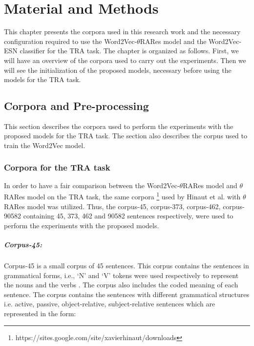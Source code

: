 \chapter{Material and Methods}\label{experiments}

This chapter presents the corpora used in this research work and the necessary configuration required to use the Word2Vec-$\theta$RARes model and the Word2Vec-ESN classifier for the TRA task. The chapter is organized as follows. First, we will have an overview of the corpora used to carry out the experiments. Then we will see the initialization of the proposed models, necessary before using the models for the TRA task.

\section{Corpora and Pre-processing}\label{corpora}

This section describes the corpora used to perform the experiments with the proposed models for the TRA task. The section also describes the corpus used to train the Word2Vec model.

\subsection{Corpora for the TRA task}

In order to have a fair comparison between the Word2Vec-$\theta$RARes model and  $\theta$RARes model on the TRA task, the same corpora \footnote{https://sites.google.com/site/xavierhinaut/downloads} used by Hinaut et al. \cite{xavier:2013:RT, tra:xavier_hri} with $\theta$RARes model was utilized. Thus, the corpus-45, corpus-373, corpus-462, corpus-90582 containing 45, 373, 462 and 90582 sentences respectively, were used to perform the experiments with the proposed models. 

\paragraph{Corpus-45:} Corpus-45 is a small corpus of 45 sentences. This corpus contains the sentences in grammatical forms, i.e., `N' and `V' tokens were used respectively to represent the nouns and the verbs \cite{xavier:2013:RT}. The corpus also includes the coded meaning of each sentence. The corpus contains the sentences with different grammatical structures i.e. active, passive, object-relative, subject-relative sentences which are represented in the form:

